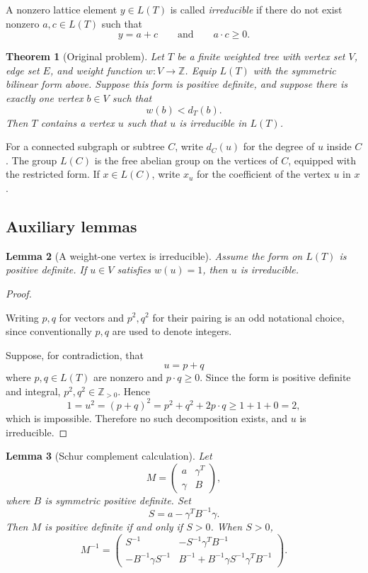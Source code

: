 \documentclass[12pt]{article}
\newcommand{\Z}{\mathbb{Z}}
\newtheorem{theorem}{Theorem}
\newtheorem{lemma}[theorem]{Lemma}
\newcommand{\review}[1]{\begin{reviewbox}#1\end{reviewbox}}
\begin{document}
A nonzero lattice element \(y\in L(T)\) is called \emph{irreducible} if there do not exist nonzero \(a,c\in L(T)\) such that
\[
y=a+c
\qquad\text{and}\qquad
a\cdot c\ge 0.
\]

\begin{theorem}[Original problem]\label{thm:main}
Let \(T\) be a finite weighted tree with vertex set \(V\), edge set \(E\), and weight function \(w:V\to\Z\). Equip \(L(T)\) with the symmetric bilinear form above. Suppose this form is positive definite, and suppose there is exactly one vertex \(b\in V\) such that
\[
w(b)<d_T(b).
\]
Then \(T\) contains a vertex \(u\) such that \(u\) is irreducible in \(L(T)\).
\end{theorem}

For a connected subgraph or subtree \(C\), write \(d_C(u)\) for the degree of \(u\) inside \(C\). The group \(L(C)\) is the free abelian group on the vertices of \(C\), equipped with the restricted form. If \(x\in L(C)\), write \(x_u\) for the coefficient of the vertex \(u\) in \(x\).

\subsection*{Auxiliary lemmas}

\begin{lemma}[A weight-one vertex is irreducible]\label{lem:weight-one}
Assume the form on \(L(T)\) is positive definite. If \(u\in V\) satisfies \(w(u)=1\), then \(u\) is irreducible.
\end{lemma}

\begin{proof}
\review{Writing $p,q$ for vectors and $p^2,q^2$ for their pairing is an odd notational choice, since conventionally $p,q$ are used to denote integers.}
Suppose, for contradiction, that
\[
u=p+q
\]
where \(p,q\in L(T)\) are nonzero and \(p\cdot q\ge 0\).
Since the form is positive definite and integral, \(p^2,q^2\in\Z_{>0}\). Hence
\[
1=u^2=(p+q)^2=p^2+q^2+2p\cdot q
\ge 1+1+0=2,
\]
which is impossible. Therefore no such decomposition exists, and \(u\) is irreducible.
\end{proof}

\begin{lemma}[Schur complement calculation]\label{lem:schur}
Let
\[
M=
\begin{pmatrix}
a & \gamma^T\\
\gamma & B
\end{pmatrix},
\]
where \(B\) is symmetric positive definite. Set
\[
S=a-\gamma^T B^{-1}\gamma.
\]
Then \(M\) is positive definite if and only if \(S>0\). When \(S>0\),
\[
M^{-1}=
\begin{pmatrix}
S^{-1} & -S^{-1}\gamma^T B^{-1}\\
-B^{-1}\gamma S^{-1} &
B^{-1}+B^{-1}\gamma S^{-1}\gamma^T B^{-1}
\end{pmatrix}.
\]
\end{lemma}
\end{document}
